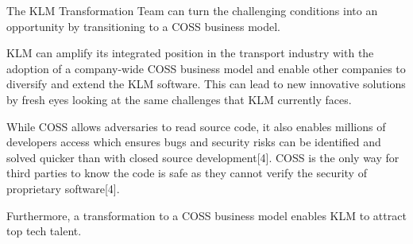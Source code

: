 \documentclass[portrait,a0paper]{rudi-poster}  %
\begin{document}

\begin{rudiblockconclusion}
    \begin{multicols}{3}
        The KLM Transformation Team can turn the challenging conditions into an opportunity by transitioning to a COSS business model.
        
        KLM can amplify its integrated position in the transport industry with the adoption of a company-wide COSS business model and enable other companies to diversify and extend the KLM software. This can lead to new innovative solutions by fresh eyes looking at the same challenges that KLM currently faces.
        
        While COSS allows adversaries to read source code, it also enables millions of developers access which ensures bugs and security risks can be identified and solved quicker than with closed source development[4]. COSS is the only way for third parties to know the code is safe as they cannot verify the security of proprietary software[4].
        
        Furthermore, a transformation to a COSS business model enables KLM to attract top tech talent.
        
        
    \end{multicols}
\end{rudiblockconclusion}

\end{document}
